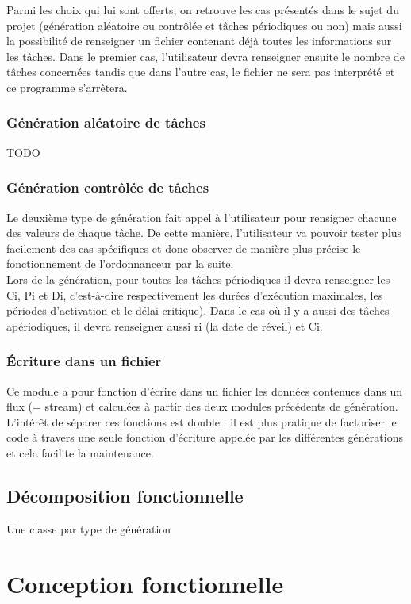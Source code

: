 Parmi les choix qui lui sont offerts, on retrouve les cas présentés dans le sujet du projet (génération aléatoire ou contrôlée et tâches périodiques ou non) mais aussi la possibilité de renseigner un fichier contenant déjà toutes les informations sur les tâches. Dans le premier cas, l’utilisateur devra renseigner ensuite le nombre de tâches concernées tandis que dans l’autre cas, le fichier ne sera pas interprété et ce programme s’arrêtera.


\subsection{Génération aléatoire de tâches}
        TODO

\subsection{Génération contrôlée de tâches}
	Le deuxième type de génération fait appel à l'utilisateur pour rensigner chacune des valeurs de chaque tâche. De cette manière, l'utilisateur va pouvoir tester plus facilement des cas spécifiques et donc observer de manière plus précise le fonctionnement de l'ordonnanceur par la suite. \\
	Lors de la génération, pour toutes les tâches périodiques il devra renseigner les Ci, Pi et Di, c'est-à-dire respectivement les durées d'exécution maximales, les périodes d'activation et le délai critique). Dans le cas où il y a aussi des tâches apériodiques, il devra renseigner aussi ri (la date de réveil) et Ci.

\subsection{Écriture dans un fichier}
	Ce module a pour fonction d’écrire dans un fichier les données contenues dans un flux (= stream)  et calculées à partir des deux modules précédents de génération. L’intérêt de séparer ces fonctions est double : il est plus pratique de factoriser le code à travers une seule fonction d’écriture appelée par les différentes générations et cela facilite la maintenance.


\section{Décomposition fonctionnelle}
Une classe par type de génération 


\chapter{Conception fonctionnelle}

